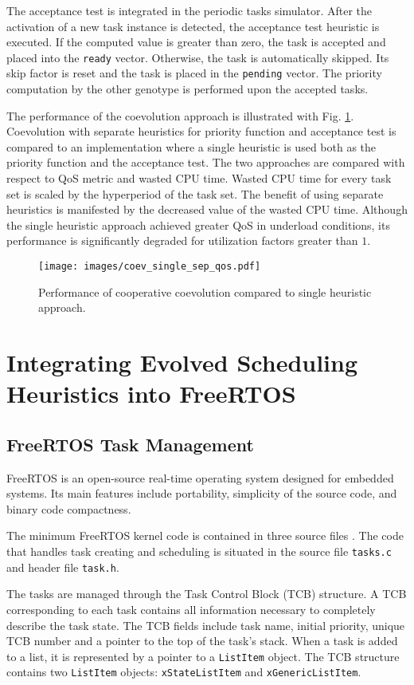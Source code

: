 The acceptance test is integrated in the periodic tasks simulator.
After the activation of a new task instance is detected, the acceptance test heuristic is executed.
If the computed value is greater than zero, the task is accepted and placed into the \texttt{ready} vector.
Otherwise, the task is automatically skipped. 
Its skip factor is reset and the task is placed in the \texttt{pending} vector.
The priority computation by the other genotype is performed upon the accepted tasks.

The performance of the coevolution approach is illustrated with Fig. \ref{coev_single_sep}.
Coevolution with separate heuristics for priority function and acceptance test is compared to an implementation where a single heuristic is used both as the priority function and the acceptance test.
The two approaches are compared with respect to QoS metric and wasted CPU time.
Wasted CPU time for every task set is scaled by the hyperperiod of the task set.
The benefit of using separate heuristics is manifested by the decreased value of the wasted CPU time.
Although the single heuristic approach achieved greater QoS in underload conditions, its performance is significantly degraded for utilization factors greater than $1$.
\begin{figure}[ht]
    \centering
    \texttt{[image: images/coev\_single\_sep\_qos.pdf]}
    \caption{Performance of cooperative coevolution compared to single heuristic approach.}
    \label{coev_single_sep}
\end{figure}

\section{Integrating Evolved Scheduling Heuristics into FreeRTOS}
\subsection{FreeRTOS Task Management}
FreeRTOS is an open-source real-time operating system designed for embedded systems. 
Its main features include portability, simplicity of the source code, and binary code compactness. 

The minimum FreeRTOS kernel code is contained in three source files \cite{brown2012architecture}. 
The code that handles task creating and scheduling is situated in the source file \verb$tasks.c$ and header file \verb$task.h$.

The tasks are managed through the Task Control Block (TCB) structure. 
A TCB corresponding to each task contains all information necessary to completely describe the task state. 
The TCB fields include task name, initial priority, unique TCB number and a pointer to the top of the task's stack. 
When a task is added to a list, it is represented by a pointer to a \verb$ListItem$ object. 
The TCB structure contains two \verb$ListItem$ objects: \verb$xStateListItem$ and \verb$xGenericListItem$.


